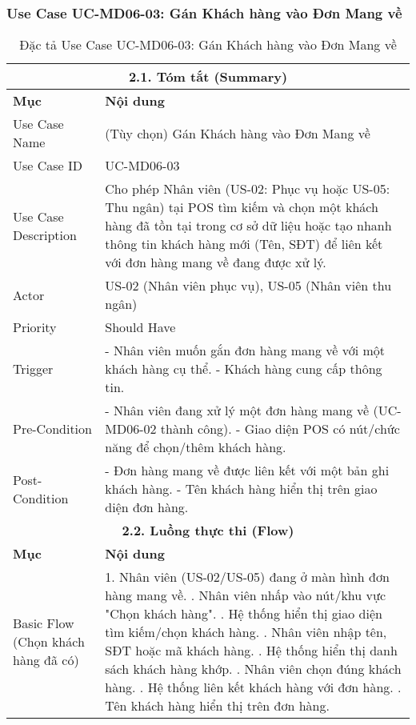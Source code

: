 \subsubsection{Use Case UC-MD06-03: Gán Khách hàng vào Đơn Mang về}
\begin{longtable}{|m{4cm}|p{11cm}|}
\caption{Đặc tả Use Case UC-MD06-03:  Gán Khách hàng vào Đơn Mang về} \label{tab:uc_md06_03_final_v3} \\
\hline
\multicolumn{2}{|c|}{\textbf{2.1. Tóm tắt (Summary)}} \\
\hline
\textbf{Mục} & \textbf{Nội dung} \\
\hline
\endhead %
\hline
\endfoot %
\hline
\endlastfoot %
Use Case Name & (Tùy chọn) Gán Khách hàng vào Đơn Mang về \\
\hline
Use Case ID & UC-MD06-03 \\
\hline
Use Case Description & Cho phép Nhân viên (US-02: Phục vụ hoặc US-05: Thu ngân) tại POS tìm kiếm và chọn một khách hàng đã tồn tại trong cơ sở dữ liệu hoặc tạo nhanh thông tin khách hàng mới (Tên, SĐT) để liên kết với đơn hàng mang về đang được xử lý. \\
\hline
Actor & US-02 (Nhân viên phục vụ), US-05 (Nhân viên thu ngân) \\
\hline
Priority & Should Have \\
\hline
Trigger & - Nhân viên muốn gắn đơn hàng mang về với một khách hàng cụ thể. \newline - Khách hàng cung cấp thông tin. \\
\hline
Pre-Condition & - Nhân viên đang xử lý một đơn hàng mang về (UC-MD06-02 thành công). \newline - Giao diện POS có nút/chức năng để chọn/thêm khách hàng. \\
\hline
Post-Condition & - Đơn hàng mang về được liên kết với một bản ghi khách hàng. \newline - Tên khách hàng hiển thị trên giao diện đơn hàng. \\
\hline
\multicolumn{2}{|c|}{\textbf{2.2. Luồng thực thi (Flow)}} \\
\hline
\textbf{Mục} & \textbf{Nội dung} \\
\hline
Basic Flow (Chọn khách hàng đã có) & 1. Nhân viên (US-02/US-05) đang ở màn hình đơn hàng mang về. \newline 2. Nhân viên nhấp vào nút/khu vực "Chọn khách hàng". \newline 3. Hệ thống hiển thị giao diện tìm kiếm/chọn khách hàng. \newline 4. Nhân viên nhập tên, SĐT hoặc mã khách hàng. \newline 5. Hệ thống hiển thị danh sách khách hàng khớp. \newline 6. Nhân viên chọn đúng khách hàng. \newline 7. Hệ thống liên kết khách hàng với đơn hàng. \newline 8. Tên khách hàng hiển thị trên đơn hàng. \\

\end{longtable}
